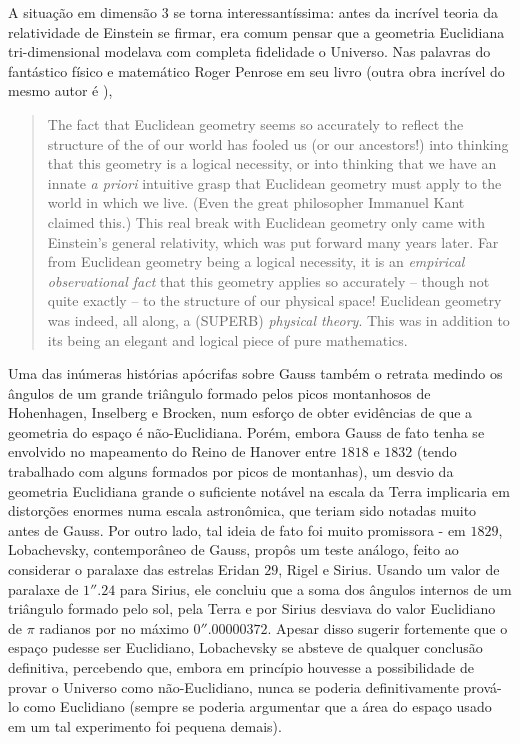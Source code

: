  \par 
A situação em dimensão $3$ se torna interessantíssima: antes da incrível teoria da relatividade de Einstein se firmar, era comum pensar que a geometria Euclidiana tri-dimensional modelava com completa fidelidade o Universo. Nas palavras do fantástico físico e matemático Roger Penrose em seu livro  (outra obra incrível do mesmo autor é ),
\blockquote{The fact that Euclidean geometry seems so accurately to reflect the structure of the  of our world has fooled us (or our ancestors!) into thinking that this geometry is a logical necessity, or into thinking that we have an innate \emph{a priori} intuitive grasp that Euclidean geometry must apply to the world in which we live. (Even the great philosopher Immanuel Kant claimed this.) This real break with Euclidean geometry only came with Einstein's general relativity, which was put forward many years later. Far from Euclidean geometry being a logical necessity, it is an \emph{empirical observational fact} that this geometry applies so accurately -- though not quite exactly -- to the structure of our physical space! Euclidean geometry was indeed, all along, a (SUPERB) \emph{physical theory}. This was in addition to its being an elegant and logical piece of pure mathematics.}
Uma das inúmeras histórias apócrifas sobre Gauss também o retrata medindo os ângulos de um grande triângulo formado pelos picos montanhosos de Hohenhagen, Inselberg e Brocken, num esforço de obter evidências de que a geometria do espaço é não-Euclidiana. Porém, embora Gauss de fato tenha se envolvido no mapeamento do Reino de Hanover entre $1818$ e $1832$ (tendo trabalhado com alguns  formados por picos de montanhas), um desvio da geometria Euclidiana grande o suficiente notável na escala da Terra implicaria em distorções enormes numa escala astronômica, que teriam sido notadas muito antes de Gauss. Por outro lado, tal ideia de fato foi muito promissora - em $1829$, Lobachevsky, contemporâneo de Gauss, propôs um teste análogo, feito ao considerar o paralaxe das estrelas Eridan $29$, Rigel e Sirius. Usando um valor de paralaxe de $1''.24$ para Sirius, ele concluiu que a soma dos ângulos internos de um triângulo formado pelo sol, pela Terra e por Sirius desviava do valor Euclidiano de $\pi$ radianos por no máximo $0''.00000372$. Apesar disso sugerir fortemente que o espaço pudesse ser Euclidiano, Lobachevsky se absteve de qualquer conclusão definitiva, percebendo que, embora em princípio houvesse a possibilidade de provar o Universo como não-Euclidiano, nunca se poderia definitivamente prová-lo como Euclidiano (sempre se poderia argumentar que a área do espaço usado em um tal experimento foi pequena demais). \par 

